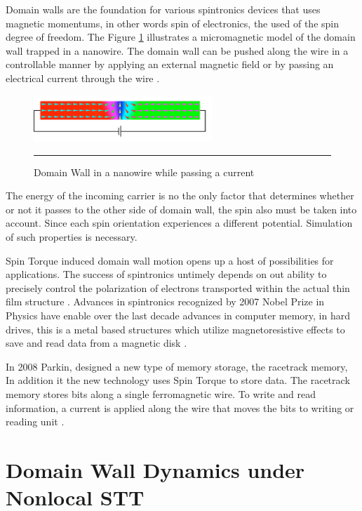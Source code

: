 Domain walls are the foundation for various spintronics devices that uses magnetic momentums, in other words spin of electronics, the used of the spin degree of freedom. The Figure \ref{fig:DWspin} illustrates a micromagnetic model of the domain wall trapped in a nanowire. The domain wall can be pushed along the wire in a controllable manner by applying an external magnetic field or by passing an electrical current through the wire \cite{dwwire}.

\begin{figure}[htbp]
	\centering
		\includegraphics[width=0.6\textwidth]{Figures/DWspin.png}
		\rule{35em}{0.52pt}
	\caption[Domain Wall nanowire]{Domain Wall in a nanowire while passing a current}
	\label{fig:DWspin}
\end{figure}

The energy of the incoming  carrier is no the only factor that determines whether or not it passes to the other side of domain wall, the spin also must be taken into account. Since each spin orientation experiences a different potential. Simulation of such properties is necessary.

Spin Torque induced domain wall motion opens up a host of possibilities for applications. The success of spintronics untimely depends on out ability to precisely  control the polarization of electrons transported within the actual thin film structure \cite{ferro}. Advances in spintronics recognized by 2007 Nobel Prize in Physics have enable over the last decade advances in computer memory, in hard drives, this is a metal based structures which utilize magnetoresistive effects to save and read data from a magnetic disk \cite{handbookspin}.

 In 2008 Parkin, designed a new type of memory storage, the racetrack memory, In addition it the new technology uses Spin Torque to store data. The racetrack memory stores bits along a single ferromagnetic wire. To write and read information, a current is applied along the wire that moves the bits to writing or reading unit \cite{racetrack}.
 
\section{Domain Wall Dynamics under Nonlocal STT}

